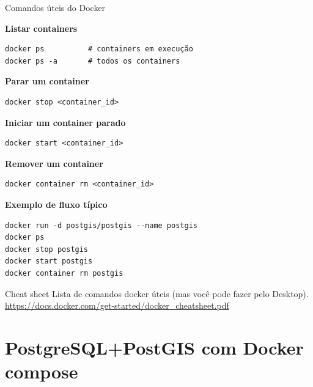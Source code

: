 \documentclass{beamer}
\begin{document}
\begin{frame}[fragile]{Comandos úteis do Docker}
    
    \textbf{Listar containers}
    
    \begin{verbatim}
docker ps          # containers em execução
docker ps -a       # todos os containers
    \end{verbatim}
    
    \textbf{Parar um container}
    
    \begin{verbatim}
docker stop <container_id>
    \end{verbatim}
    
    \textbf{Iniciar um container parado}
    
    \begin{verbatim}
docker start <container_id>
    \end{verbatim}
    
    \textbf{Remover um container}
    
    \begin{verbatim}
docker container rm <container_id>
    \end{verbatim}
    
    \textbf{Exemplo de fluxo típico}
    
    \begin{verbatim}
docker run -d postgis/postgis --name postgis
docker ps
docker stop postgis
docker start postgis
docker container rm postgis
    \end{verbatim}
    
\end{frame}

\begin{frame}{Cheat sheet}
\centering 
Lista de comandos docker úteis (mas você pode fazer pelo Desktop).
\large \url{https://docs.docker.com/get-started/docker_cheatsheet.pdf}
\end{frame}

\section{PostgreSQL+PostGIS com Docker compose}
\end{document}
